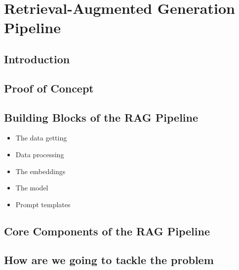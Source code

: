 \chapter{Retrieval-Augmented Generation Pipeline}

\section{Introduction}
\section{Proof of Concept}
\section{Building Blocks of the RAG Pipeline}
\begin{itemize}
    \item The data getting
    \item Data processing
    \item The embeddings
    \item The model
    \item Prompt templates
\end{itemize}
\section{Core Components of the RAG Pipeline}
\section{How are we going to tackle the problem}
